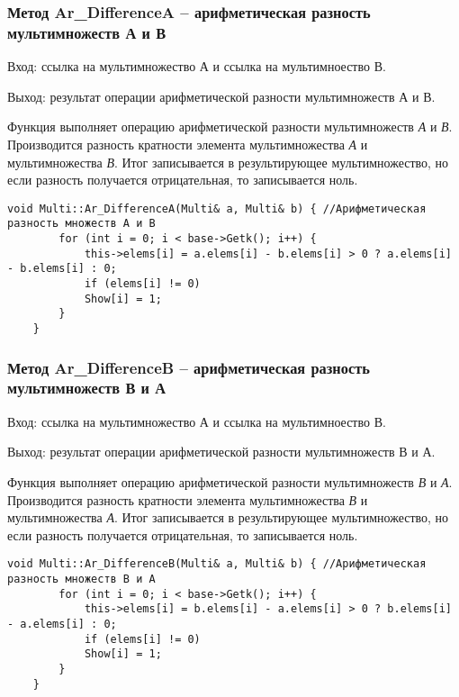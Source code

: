 \documentclass[10pt,a4paper,final]{article} %
\begin{document}
 \subsubsection {Метод Ar\_DifferenceA -- арифметическая разность мультимножеств А и В}
\par Вход: ссылка на мультимножество А и ссылка на мультимноество В. 
 \par Выход: результат операции арифметической разности мультимножеств А и В.
\par Функция выполняет операцию арифметической разности мультимножеств \textit{А} и \textit{В}. Производится разность кратности элемента мультимножества \textit{А} и мультимножества \textit{В}. Итог записывается в результирующее мультимножество, но если разность получается отрицательная, то записывается ноль.
 \begin{lstlisting}[caption={Метод Ar\_DifferenceA}]
 	void Multi::Ar_DifferenceA(Multi& a, Multi& b) { //Арифметическая разность множеств A и B
 		for (int i = 0; i < base->Getk(); i++) {
 			this->elems[i] = a.elems[i] - b.elems[i] > 0 ? a.elems[i] - b.elems[i] : 0;
 			if (elems[i] != 0)
 			Show[i] = 1;
 		}
 	}
 \end{lstlisting}
 
 
 \subsubsection {Метод Ar\_DifferenceB -- арифметическая  разность мультимножеств В и А}
\par Вход: ссылка на мультимножество А и ссылка на мультимноество В. 
 \par Выход: результат операции арифметической разности мультимножеств В и А.
 \par Функция выполняет операцию арифметической разности мультимножеств \textit{В} и \textit{А}. Производится разность кратности элемента мультимножества \textit{В} и мультимножества \textit{А}. Итог записывается в результирующее мультимножество, но если разность получается отрицательная, то записывается ноль.
 \begin{lstlisting}[caption={Метод Ar\_DifferenceB}]
 	void Multi::Ar_DifferenceB(Multi& a, Multi& b) { //Арифметическая разность множеств B и A
 		for (int i = 0; i < base->Getk(); i++) {
 			this->elems[i] = b.elems[i] - a.elems[i] > 0 ? b.elems[i] - a.elems[i] : 0;
 			if (elems[i] != 0)
 			Show[i] = 1;
 		}
 	}
 \end{lstlisting}
 
\end{document}
